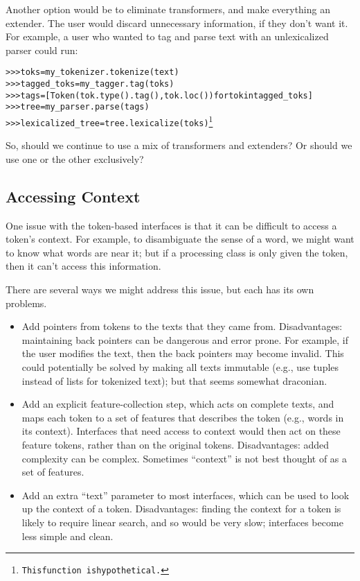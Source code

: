 \documentclass[11pt]{article}
\begin{document}
Another option would be to eliminate transformers, and make
everything an extender.  The user would discard unnecessary
information, if they don't want it.  For example, a user who wanted
to tag and parse text with an unlexicalized parser could run:

\begin{alltt}
  >>> toks = my\_tokenizer.tokenize(text)
  >>> tagged\_toks = my\_tagger.tag(toks)
  >>> tags = [Token(tok.type().tag(), tok.loc()) for tok in tagged\_toks]
  >>> tree = my\_parser.parse(tags)
  >>> lexicalized\_tree = tree.lexicalize(toks)\footnote{This function\
is hypothetical.}
\end{alltt}

So, should we continue to use a mix of transformers and extenders?  Or
should we use one or the other exclusively?

\subsection{Accessing Context}

One issue with the token-based interfaces is that it can be difficult
to access a token's context.  For example, to disambiguate the sense
of a word, we might want to know what words are near it; but if a
processing class is only given the token, then it can't access this
information.

There are several ways we might address this issue, but each has its
own problems.

\begin{itemize}
\item Add pointers from tokens to the texts that they came from.
  Disadvantages: maintaining back pointers can be dangerous and error
  prone.  For example, if the user modifies the text, then the back
  pointers may become invalid.  This could potentially be solved by
  making all texts immutable (e.g., use tuples instead of lists for
  tokenized text); but that seems somewhat draconian.
  
\item Add an explicit feature-collection step, which acts on complete
  texts, and maps each token to a set of features that describes the
  token (e.g., words in its context).  Interfaces that need access to
  context would then act on these feature tokens, rather than on the
  original tokens.  Disadvantages: added complexity can be complex.
  Sometimes ``context'' is not best thought of as a set of features.
  
\item Add an extra ``text'' parameter to most interfaces, which can be
  used to look up the context of a token.  Disadvantages: finding the
  context for a token is likely to require linear search, and so would
  be very slow; interfaces become less simple and clean.
\end{itemize}
    
\end{document}
